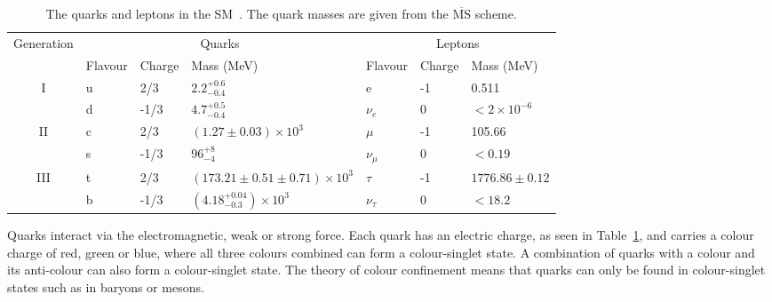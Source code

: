 \vspace{0.8cm}
\begin{table}[ht!]
\centering
\footnotesize
\begin{tabular}{|c|l|l|l|l|l|l|}
\hline
\multirow{2}{*}{Generation} & \multicolumn{3}{c|}{Quarks}                             & \multicolumn{3}{c|}{Leptons}              \\ \cline{2-7} 
                            & Flavour & Charge & Mass (MeV)                           & Flavour      & Charge & Mass (MeV)        \\ \hline
\hline

\multirow{2}{*}{I}          & u       & 2/3    & $2.2^{+0.6}_{-0.4}$                  & e            & -1     & 0.511             \\
                            & d       & -1/3   & $4.7^{+0.5}_{-0.4}$                  & $\nu_{e}$    & 0      & $<2\times10^{-6}$ \\ \hline
\multirow{2}{*}{II}         & c       & 2/3    & $(1.27\pm 0.03)\times10^{3}$         & $\mu$        & -1     & 105.66            \\
                            & s       & -1/3   & $96^{+8}_{-4}$                       & $\nu_{\mu}$  & 0      & $<0.19$           \\ \hline
\multirow{2}{*}{III}        & t       & 2/3    & $(173.21\pm0.51\pm0.71)\times10^{3}$ & $\tau$       & -1     & $1776.86\pm0.12$  \\
                            & b       & -1/3   & $(4.18^{+0.04}_{-0.3})\times10^{3}$  & $\nu_{\tau}$ & 0      & $<18.2$           \\ \hline
\end{tabular}
\caption{The quarks and leptons in the SM~\cite{PDG2016}. The quark masses are given from the $\overline{\textrm{MS}}$ scheme. }
\label{table:SMmatter}

\end{table}
Quarks interact via the electromagnetic, weak or strong force. Each quark has an electric charge, as seen in Table~\ref{table:SMmatter}, and carries a colour charge of red, green or blue, where all three colours combined can form a colour-singlet state. A combination of quarks with a colour and its anti-colour can also form a colour-singlet state. The theory of colour confinement means that quarks can only be found in colour-singlet states such as in baryons or mesons. 

